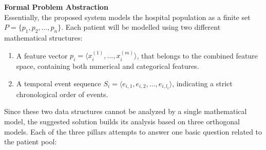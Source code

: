 \textbf{Formal Problem Abstraction} \\
Essentially, the proposed system models the hospital population as a finite set $P = \{p_1, p_2, \dots, p_n\}$. Each patient will be modelled using two different mathematical structures:
\begin{enumerate}
    \item A feature vector $p_i = \langle x_i^{(1)}, \dots, x_i^{(m)} \rangle$, that belongs to the combined feature space, containing both numerical and categorical features.
    \item A temporal event sequence $S_i = \langle e_{i,1}, e_{i,2}, \dots, e_{i,l_i} \rangle$, indicating a strict chronological order of events.
\end{enumerate}

\vspace{1em}

Since these two data structures cannot be analyzed by a single mathematical model, the suggested solution builds its analysis based on three orthogonal models. Each of the three pillars attempts to answer one basic question related to the patient pool:

\vspace{1em}

